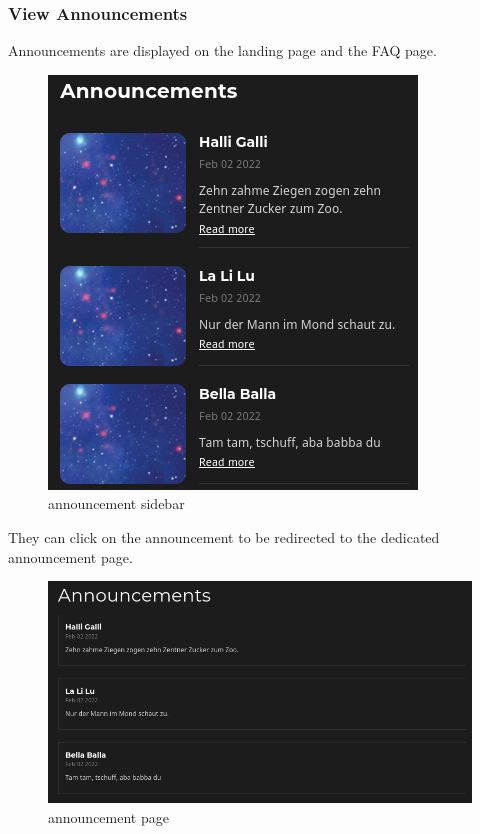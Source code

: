 \documentclass[
]{article}
\begin{document}
\hypertarget{view-announcements}{%
\subsubsection{View Announcements}\label{view-announcements}}

Announcements are displayed on the landing page and the FAQ page.

\begin{figure}
\centering
\includegraphics{images/announcements_sidebar.png}
\caption{announcement sidebar}
\end{figure}\newpage

They can click on the announcement to be redirected to the dedicated
announcement page.

\begin{figure}
\centering
\includegraphics{images/announcement_page.png}
\caption{announcement page}
\end{figure}\newpage
\end{document}
